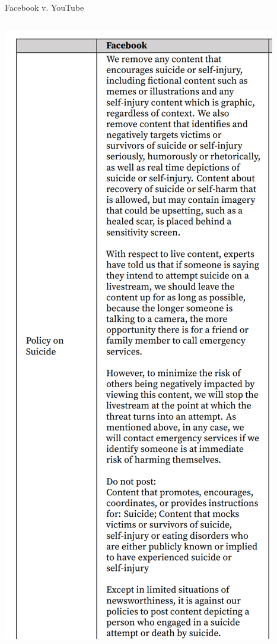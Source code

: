 \documentclass[nobackground,dvipsnames,table,aspectratio=169]{beamer}
\begin{document}
\begin{frame}{Facebook v. YouTube}
    \begin{columns}
            \includegraphics[width=\textwidth]{policy-on-suicide-facebook}

\end{columns}
\end{frame}
\end{document}
